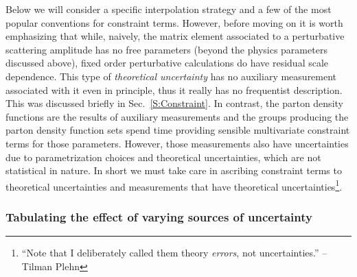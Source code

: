 \documentclass{cernrep}
\begin{document}
Below we will consider a specific interpolation strategy and a few of the most popular conventions for constraint terms.  However, before moving on it is worth emphasizing that while, naively, the matrix element associated to a perturbative scattering amplitude has no free parameters (beyond the physics parameters discussed above), fixed order perturbative calculations do have residual  scale dependence.  This type of \textit{theoretical uncertainty} has no auxiliary measurement associated with it even in principle, thus it really has no frequentist description.  This was discussed briefly in Sec.~\ref{S:Constraint}.  In contrast, the parton density functions are the results of auxiliary measurements and the groups producing the parton density function sets spend time providing sensible multivariate constraint terms for those parameters.  However, those measurements also have uncertainties due to parametrization choices and theoretical uncertainties, which are not statistical in nature.  In short we must take care in ascribing constraint terms to theoretical uncertainties and measurements that have theoretical uncertainties\footnote{``Note that I deliberately called them theory \textit{errors}, not uncertainties.'' -- Tilman Plehn}.  

\subsubsection{Tabulating the effect of varying sources of uncertainty}
\end{document}
